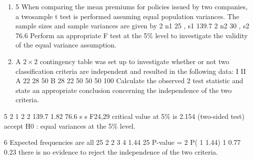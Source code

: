 \documentclass[a4paper,12pt]{article}
\begin{document}
\begin{enumerate}
\item

5 When comparing the mean premiums for policies issued by two companies, a twosample
t test is performed assuming equal population variances. The sample sizes and
sample variances are given by
2
n1 25 , s1 139.7
2
n2 30 , s2 76.6
Perform an appropriate F test at the 5\% level to investigate the validity of the equal
variance assumption.
\item A $2 \times 2$ contingency table was set up to investigate whether or not two classification
criteria are independent and resulted in the following data:
I II
A 22 28 50
B 28 22 50
50 50 100
Calculate the observed 2 test statistic and state an appropriate conclusion concerning
the independence of the two criteria. 

\end{enumerate}
5
2
1
2
2
139.7
1.82
76.6
s
s
F24,29 critical value at 5\% is 2.154 (two-sided test)
accept H0 : equal variances at the 5\% level.

\newpage 
6 Expected frequencies are all 25
2
2 3
4 1.44
25
P-value = 2
P( 1 1.44) 1 0.77 0.23
there is no evidence to reject the independence of the two criteria.

\end{document}
